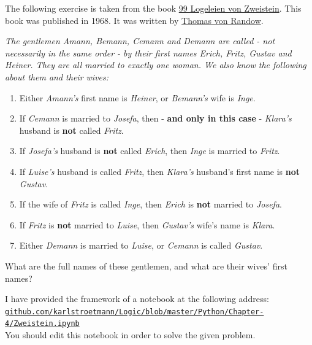 \exerciseEng
The following exercise is taken from the book 
\href{https://www.amazon.de/Logeleien-Zweistein-ihren-Antworten-Wegner/dp/B006YF0VUE}{99 Logeleien von Zweistein}.
This book was published in 1968.  It was written by 
\href{http://de.wikipedia.org/wiki/Thomas_von_Randow}{Thomas von Randow}.

\begin{minipage}{0.95\linewidth}
  {\sl
    The gentlemen \emph{Amann}, \emph{Bemann}, \emph{Cemann} and \emph{Demann} are called - not
    necessarily in the same order - by their 
    first names \emph{Erich}, \emph{Fritz}, \emph{Gustav} and \emph{Heiner}. They are all married to
    exactly one woman. We also know the following about them and their wives: 
    \begin{enumerate}
    \item Either \emph{Amann's} first name is \emph{Heiner}, or \emph{Bemann's} wife is \emph{Inge}.
    \item If \emph{Cemann} is married to \emph{Josefa}, then - \textbf{and only in this case} -
          \emph{Klara's} husband is \textbf{not} called \emph{Fritz}.
    \item If \emph{Josefa's} husband is \textbf{not} called \emph{Erich}, then \emph{Inge} is married to
          \emph{Fritz}. 
    \item If \emph{Luise's} husband is called \emph{Fritz}, then \emph{Klara's} husband's first name is
          \textbf{not} \emph{Gustav}. 
    \item If the wife of \emph{Fritz} is called \emph{Inge}, then \emph{Erich} is \textbf{not} married to
          \emph{Josefa}. 
    \item If \emph{Fritz} is \textbf{not} married to \emph{Luise}, then \emph{Gustav's} wife's name is \emph{Klara}.
    \item Either \emph{Demann} is married to \emph{Luise}, or \emph{Cemann} is called \emph{Gustav}.
    \end{enumerate}
    What are the full names of these gentlemen, and what are their wives' first names?}
\end{minipage}
\vspace*{0.3cm}

\noindent
I have provided the framework of a notebook at the following address:
\\[0.2cm]
\hspace*{1.3cm}
\href{https://github.com/karlstroetmann/Logic/blob/master/Python/Chapter-4/Zweistein.ipynb}{\texttt{github.com/karlstroetmann/Logic/blob/master/Python/Chapter-4/Zweistein.ipynb}}
\\[0.2cm]
You should edit this notebook in order to solve the given problem.

